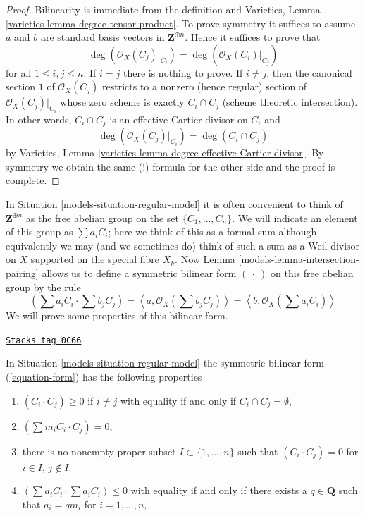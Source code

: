 \begin{proof}
Bilinearity is immediate from the definition and
Varieties, Lemma \ref{varieties-lemma-degree-tensor-product}.
To prove symmetry it suffices to assume $a$ and $b$ are
standard basis vectors in $\mathbf{Z}^{\oplus n}$.
Hence it suffices to prove that
$$
\deg(\mathcal{O}_X(C_j)|_{C_i}) = \deg(\mathcal{O}_X(C_i)|_{C_j})
$$
for all $1 \leq i, j \leq n$. If $i = j$ there is nothing to prove.
If $i \not = j$, then the canonical section $1$ of $\mathcal{O}_X(C_j)$
restricts to a nonzero (hence regular) section of $\mathcal{O}_X(C_j)|_{C_i}$
whose zero scheme is exactly $C_i \cap C_j$ (scheme theoretic intersection).
In other words, $C_i \cap C_j$ is an effective Cartier divisor on $C_i$
and
$$
\deg(\mathcal{O}_X(C_j)|_{C_i}) = \deg(C_i \cap C_j)
$$
by Varieties, Lemma \ref{varieties-lemma-degree-effective-Cartier-divisor}.
By symmetry we obtain the same (!) formula for the other side
and the proof is complete.
\end{proof}

In Situation \ref{models-situation-regular-model} it is often convenient to think
of $\mathbf{Z}^{\oplus n}$ as the free abelian group on the set
$\{C_1, \ldots, C_n\}$. We will indicate an element of this group
as $\sum a_i C_i$; here we think of this as a formal sum although
equivalently we may (and we sometimes do)
think of such a sum as a Weil divisor on $X$
supported on the special fibre $X_k$. Now
Lemma \ref{models-lemma-intersection-pairing}
allows us to define a symmetric bilinear form $(\ \cdot\ )$
on this free abelian group by the rule
\begin{equation}
\label{equation-form}
\left(\sum a_i C_i \cdot \sum b_j C_j\right) =
\left\langle a, \mathcal{O}_X(\sum b_j C_j) \right\rangle =
\left\langle b, \mathcal{O}_X(\sum a_i C_i) \right\rangle
\end{equation}
We will prove some properties of this bilinear form.

\begin{lemma}
\label{models-lemma-properties-form}
\href{https://stacks.math.columbia.edu/tag/0C66}{\texttt{Stacks tag 0C66}}

In Situation \ref{models-situation-regular-model} the symmetric bilinear form
(\ref{equation-form}) has the following properties
\begin{enumerate}
\item $(C_i \cdot C_j) \geq 0$ if $i \not = j$ with equality if and only
if $C_i \cap C_j = \emptyset$,
\item $(\sum m_i C_i \cdot C_j) = 0$,
\item there is no nonempty proper subset $I \subset \{1, \ldots, n\}$
such that $(C_i \cdot C_j) = 0$ for $i \in I$, $j \not \in I$.
\item $(\sum a_i C_i \cdot \sum a_i C_i) \leq 0$ with equality if and
only if there exists a $q \in \mathbf{Q}$ such that $a_i = qm_i$
for $i = 1, \ldots, n$,
\end{enumerate}
\end{lemma}

